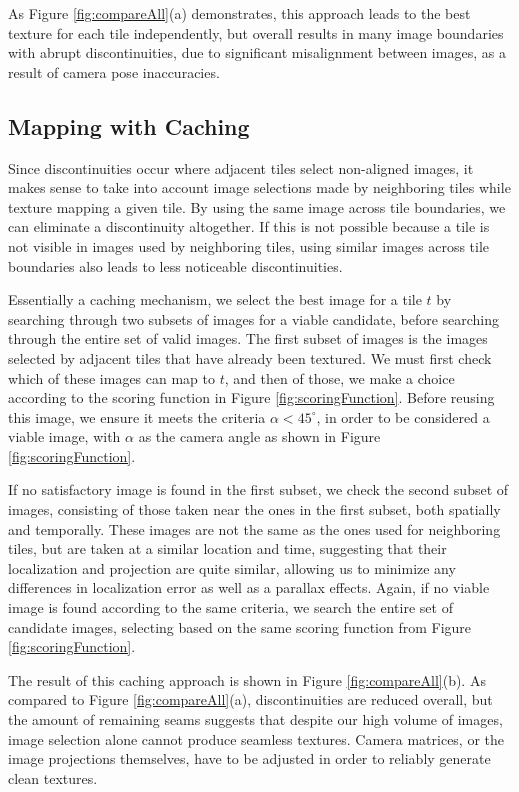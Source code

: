 \documentclass[]{spie}  %
\begin{document}
As Figure \ref{fig:compareAll}(a) demonstrates, this approach leads to
the best texture for each tile independently, but overall results in
many image boundaries with abrupt discontinuities, due to significant
misalignment between images, as a result of camera pose inaccuracies.

\subsection{Mapping with Caching}
\label{sec:mappingWithCaching}
Since discontinuities occur where adjacent tiles select non-aligned
images, it makes sense to take into account image selections made by
neighboring tiles while texture mapping a given tile. By using the
same image across tile boundaries, we can eliminate a discontinuity
altogether. If this is not possible because a tile is not visible in
images used by neighboring tiles, using similar images across tile
boundaries also leads to less noticeable discontinuities.

Essentially a caching mechanism, we select the best image for a tile
$t$ by searching through two subsets of images for a viable candidate,
before searching through the entire set of valid images. The first
subset of images is the images selected by adjacent tiles that have
already been textured. We must first check which of these images can
map to $t$, and then of those, we make a choice according to the
scoring function in Figure \ref{fig:scoringFunction}. Before reusing
this image, we ensure it meets the criteria $\alpha < 45^\circ$, in
order to be considered a viable image, with $\alpha$ as the camera
angle as shown in Figure \ref{fig:scoringFunction}.

If no satisfactory image is found in the first subset, we check the
second subset of images, consisting of those taken near the ones in
the first subset, both spatially and temporally. These images are not
the same as the ones used for neighboring tiles, but are taken at a
similar location and time, suggesting that their localization and
projection are quite similar, allowing us to minimize any differences
in localization error as well as a parallax effects. Again, if no
viable image is found according to the same criteria, we search the
entire set of candidate images, selecting based on the same scoring
function from Figure \ref{fig:scoringFunction}.

The result of this caching approach is shown in Figure
\ref{fig:compareAll}(b). As compared to Figure
\ref{fig:compareAll}(a), discontinuities are reduced overall, but the
amount of remaining seams suggests that despite our high volume of
images, image selection alone cannot produce seamless textures. Camera
matrices, or the image projections themselves, have to be adjusted in
order to reliably generate clean textures.
\end{document}
